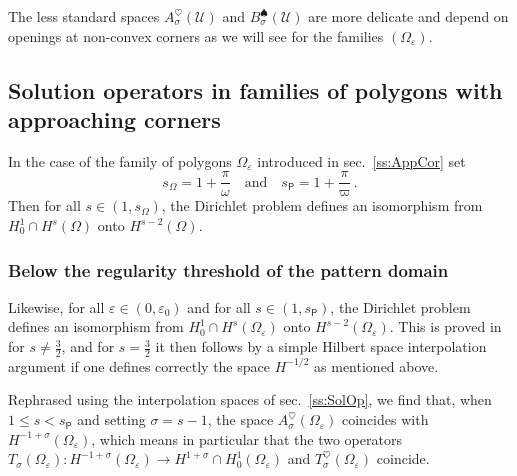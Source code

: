 \documentclass[titlepage,12pt]{amsart}
\theoremstyle{definition}
\theoremstyle{remark}
\numberwithin{equation}{section}
\newcommand{\sU}{{\mathscr U}}
\newcommand{\rP}{{\mathsf{P}}}
\begin{document}
The less standard spaces $A_\sigma^\heartsuit(\sU)$ and $B_\sigma^\spadesuit(\sU)$ are more delicate and depend on openings at non-convex corners as we will see for the families $(\Omega_\varepsilon)$. 


\subsection{Solution operators in families of polygons with approaching corners}
In the case of the family of polygons $\Omega_\varepsilon$ introduced in sec.\ \ref{ss:AppCor}
set
\[
   s_\Omega = 1+\frac{\pi}{\omega}\quad\mbox{and}\quad
   s_\rP = 1+\frac{\pi}{\varpi}\,.
\]
Then for all $s\in(1,s_\Omega)$, the Dirichlet problem defines an isomorphism from $H^1_0\cap H^s(\Omega)$ onto $H^{s-2}(\Omega)$. 

\subsubsection{Below the regularity threshold of the pattern domain}
Likewise, for all $\varepsilon\in(0,\varepsilon_0)$ and for all $s\in(1,s_\rP)$, the Dirichlet problem defines an isomorphism from $H^1_0\cap H^s(\Omega_\varepsilon)$ onto $H^{s-2}(\Omega_\varepsilon)$. 
This is proved in \cite{DBook:1988} for $s\ne\frac32$, and for $s=\frac32$ it then follows by a simple Hilbert space interpolation argument if one defines correctly the space $H^{-1/2}$ as mentioned above.

Rephrased using the interpolation spaces of sec.\ \ref{ss:SolOp}, we find that, when $1\le s<s_\rP$ and setting $\sigma=s-1$, the space $A_\sigma^\heartsuit(\Omega_\varepsilon)$ coincides with $H^{-1+\sigma}(\Omega_\varepsilon)$, which means in particular that the two operators $T_\sigma(\Omega_\varepsilon):H^{-1+\sigma}(\Omega_\varepsilon)\to H^{1+\sigma}\cap H^1_0(\Omega_\varepsilon)$ and $T_\sigma^\heartsuit(\Omega_\varepsilon)$ coincide.
\end{document}
